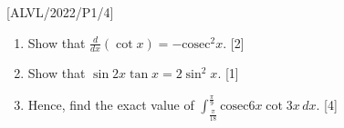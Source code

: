 \item {[}ALVL/2022/P1/4{]}
\begin{enumerate}
\item Show that $\frac{d}{dx}\left(\cot x\right)=-\mathrm{cosec}^{2}x$.
\hfill{}{[}2{]}
\item Show that $\sin2x\tan x=2\sin^{2}x$. \hfill{}{[}1{]}
\item Hence, find the exact value of $\int_{\frac{\pi}{18}}^{\frac{\pi}{9}}\mathrm{cosec}6x\cot3x\,dx$.
\hfill{}{[}4{]}
\end{enumerate}
